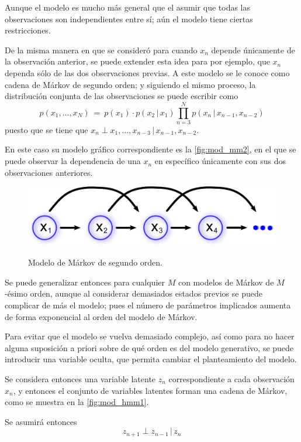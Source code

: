 Aunque el modelo es mucho más general que el asumir que todas las observaciones son independientes entre sí; aún el modelo tiene ciertas restricciones. 

De la misma manera en que se consideró para cuando $x_n$ depende únicamente de la observación anterior, se puede extender esta idea para por ejemplo, que $x_n$ dependa sólo de las dos observaciones previas. A este modelo se le conoce como cadena de Márkov de segundo orden; y siguiendo el mismo proceso, la distribución conjunta de las observaciones se puede escribir como 
\begin{equation}
\label{eqn:2-5}
p(x_1, ..., x_N) ~=~ p(x_1) \cdot p(x_2 \,|\, x_1) 
        \prod_{n=3}^N p(x_n \,|\, x_{n-1}, x_{n-2})
\end{equation}
puesto que se tiene que $x_n \perp x_1, ..., x_{n-3} \,|\, x_{n-1}, x_{n-2}$.

En este caso su modelo gráfico correspondiente es la \autoref{fig:mod_mm2}, en el que se puede observar la dependencia de una $x_n$ en específico únicamente con sus dos observaciones anteriores.

\begin{figure}[bt]
        \myfloatalign
        {\includegraphics[width=0.6\linewidth]{gfx/chap2/mod-mm2}}
        \caption{Modelo de Márkov de segundo orden.}
        \label{fig:mod_mm2}
\end{figure}

Se puede generalizar entonces para cualquier $M$ con modelos de Márkov de $M$-ésimo orden, aunque al considerar demasiados estados previos se puede complicar de más el modelo; pues el número de parámetros implicados aumenta de forma exponencial al orden del modelo de Márkov.

Para evitar que el modelo se vuelva demasiado complejo, así como para no hacer alguna suposición a priori sobre de qué orden es del modelo generativo, se puede introducir una variable oculta, que permita cambiar el planteamiento del modelo. 

Se considera entonces una variable latente $z_n$ correspondiente a cada  observación $x_n$, y entonces el conjunto de variables latentes forman una cadena de Márkov, como se muestra en la \autoref{fig:mod_hmm1}.

Se asumirá entonces 
\begin{equation}
\label{eqn:2-6}
z_{n+1} \perp z_{n-1} \,|\, z_{n}
\end{equation}

